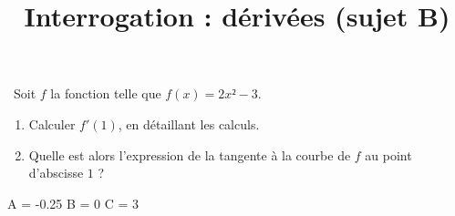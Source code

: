 \documentclass[
	classe=$1^{ere}STI2D$,
	landscape,
	twocolumn,
]{évaluation}
\begin{document}
\begin{exercice}\
	Soit $f$ la fonction telle que $f(x) = 2x² - 3$.

	\begin{enumerate}
		\item Calculer $f'(1)$, en détaillant les calculs.

		\item Quelle est alors l'expression de la tangente à la courbe de $f$ au point d'abscisse $1$ ?

	\end{enumerate}
\end{exercice}

\newpage
\setcounter{exercice}{1}

\title{Interrogation : dérivées (sujet B)}
\maketitle

\begin{luacode}
	A = -0.25
	B = 0
	C = 3
\end{luacode}
\end{document}
